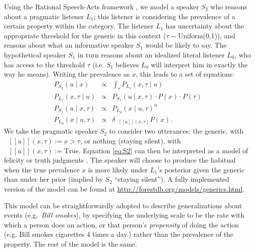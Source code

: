 \documentclass[11pt,letterpaper]{article}
\newcommand{\denote}[1]{\mbox{ $[\![ #1 ]\!]$}}
\begin{document}
Using the Rational Speech-Acts framework \cite{Frank2012,Goodman2013}, 
we model a speaker $S_2$ who reasons about a pragmatic listener $L_1$; this listener is considering the prevalence of a certain property within the category.
The listener $L_1$ has uncertainty about the appropriate threshold for the generic in this context ($\tau \sim \text{Uniform}$(0,1)), and reasons about what an informative speaker $S_1$ would be likely to say. The hypothetical speaker $S_1$ in turn reasons about an idealized literal listener $L_0$, who has access to the threshold $\tau$ (i.e. $S_1$ believes $L_0$ will interpret him in exactly the way he means). 
Writing the prevalence as $x$, this leads to a set of equations:
%
\begin{eqnarray}
P_{S_{2}}(u \mid x) & \propto &  \int_{\tau} P_{L_{1}}(x , \tau \mid u) \label{eq:S2}\\
P_{L_{1}}(x , \tau \mid u) &\propto& P_{S_{1}}(u \mid x, \tau) \cdot P(x) \cdot P(\tau) \label{eq:L1}\\
P_{S_{1}}(u \mid x, \tau) &\propto&  {P_{L_{0}}(x \mid u, \tau)}^{\alpha} \label{eq:S1}\\
P_{L_{0}}(x \mid u, \tau) &\propto& {\delta_{\denote{u}(x, \tau)} P(x)}. \label{eq:L0}
\end{eqnarray}
%
We take the pragmatic speaker $S_2$ to consider two utterances: the generic, with $\denote{u}(x, \tau) := x>\tau$, or nothing (staying silent), with $\denote{u}(x, \tau) := \text{True}$.
Equation \ref{eq:S2} can then be interpreted as a model of felicity or truth judgments \cite{Degen2014, TesslerUnderReview}.
The speaker will choose to produce the habitual when the true prevalence $x$ is more likely under $L_1$'s posterior given the generic than under her prior (implied by $S_2$ ``staying silent''). 
A fully implemented version of the model can be found at \url{http://forestdb.org/models/generics.html}.

This model can be straightforwardly adopted to describe generalizations about events (e.g.~\emph{Bill smokes}), by specifying the underlying scale to be the rate with which a person does an action, or that person's \emph{propensity} of doing the action (e.g. Bill smokes cigarettes 4 times a day.) rather than the prevalence of the property. 
The rest of the model is the same.



 
\end{document}
